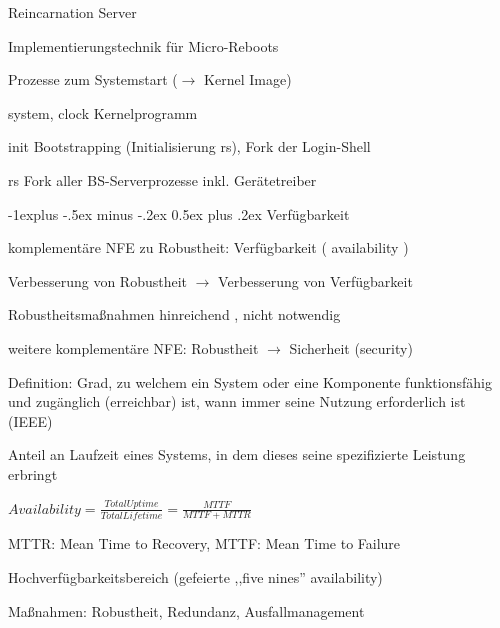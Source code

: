 \documentclass[a4paper]{article}
\makeatletter
\renewcommand{\subsection}{\@startsection{subsection}{2}{0mm}%
 {-1explus -.5ex minus -.2ex}%
 {0.5ex plus .2ex}%
 {\normalfont\normalsize\bfseries}}
\makeatother
\begin{document}
\begin{multicols}{3}
    Reincarnation Server
    \begin{itemize*}
        \item Implementierungstechnik für Micro-Reboots
        \item Prozesse zum Systemstart ($\rightarrow$ Kernel Image)
        \begin{description*}
            \item[system, clock] Kernelprogramm
            \item[init] Bootstrapping (Initialisierung rs), Fork der Login-Shell
            \item[rs] Fork aller BS-Serverprozesse inkl. Gerätetreiber
        \end{description*}
    \end{itemize*}

    \subsection{Verfügbarkeit}
    \begin{itemize*}
        \item komplementäre NFE zu Robustheit: Verfügbarkeit ( availability )
        \item Verbesserung von Robustheit $\rightarrow$ Verbesserung von Verfügbarkeit
        \item Robustheitsmaßnahmen hinreichend , nicht notwendig %
        \item weitere komplementäre NFE: Robustheit $\rightarrow$ Sicherheit (security)
        \item Definition: Grad, zu welchem ein System oder eine Komponente funktionsfähig und zugänglich (erreichbar) ist, wann immer seine Nutzung erforderlich ist (IEEE)
        \item Anteil an Laufzeit eines Systems, in dem dieses seine spezifizierte Leistung erbringt
        \item $Availability= \frac{Total Uptime}{Total Lifetime}= \frac{MTTF}{MTTF + MTTR}$
        \item MTTR: Mean Time to Recovery, MTTF: Mean Time to Failure
        \item Hochverfügbarkeitsbereich (gefeierte ,,five nines'' availability)
        \item Maßnahmen: Robustheit, Redundanz, Ausfallmanagement
    \end{itemize*}


\end{multicols}
\end{document}
